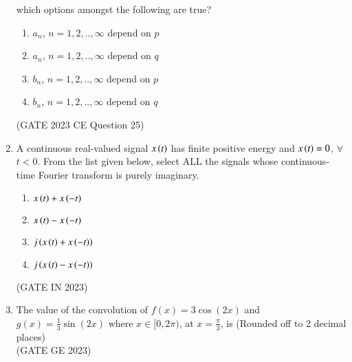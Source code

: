 \begin{enumerate}[label=\thechapter.\arabic*,ref=\thechapter.\theenumi]
which options amongst the following are true?
\begin{enumerate}[label=(\alph*)]
    \item $a_n$, $n=1,2,..,\infty$ depend on $p$
    \item $a_n$, $n=1,2,..,\infty$ depend on $q$
    \item $b_n$, $n=1,2,..,\infty$ depend on $p$
    \item $b_n$, $n=1,2,..,\infty$ depend on $q$
\end{enumerate}
\hfill(GATE 2023 CE Question 25)\\
\solution
\newpage
\item A continuous real-valued signal $x\left(t\right)$ has finite positive energy and $x\left(t\right) = 0$, $\forall$ $t < 0$. From the list given below, select ALL the signals whose
continuous-time Fourier transform is purely imaginary.\\
\begin{enumerate}
\item$x\left(t\right) + x\left(-t\right)$
\item$x\left(t\right) - x\left(-t\right)$
\item$j\left(x\left(t\right) + x\left(-t\right)\right)$
\item$j\left(x\left(t\right) - x\left(-t\right)\right)$
\end{enumerate}
\hfill{(GATE IN 2023)}\\
\solution
\item The value of the convolution of $f(x) = 3\cos(2x)$ and $g(x) = \frac{1}{3}\sin(2x)$ where $x \in [0, 2\pi)$, at $x = \frac{\pi}{3}$, is (Rounded off to 2 decimal places)\\
\hfill(GATE GE 2023)\\
\solution
\end{enumerate}
